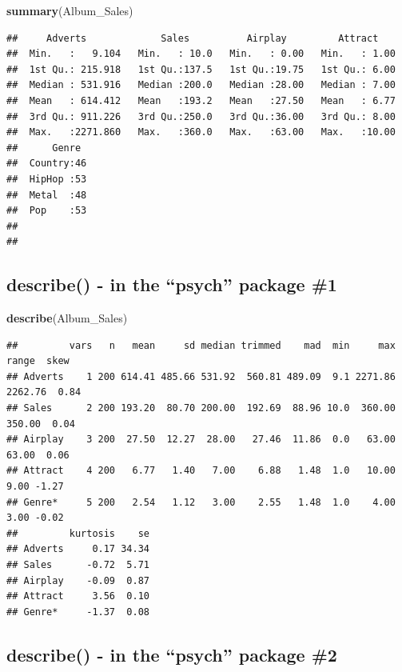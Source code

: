 \documentclass[
]{book}
\newenvironment{Shaded}{\begin{snugshade}}{\end{snugshade}}
\newcommand{\KeywordTok}[1]{\textcolor[rgb]{0.13,0.29,0.53}{\textbf{#1}}}
\newcommand{\NormalTok}[1]{#1}
\begin{document}
\begin{Shaded}
\begin{Highlighting}[]
\KeywordTok{summary}\NormalTok{(Album_Sales)}
\end{Highlighting}
\end{Shaded}

\begin{verbatim}
##     Adverts             Sales          Airplay         Attract     
##  Min.   :   9.104   Min.   : 10.0   Min.   : 0.00   Min.   : 1.00  
##  1st Qu.: 215.918   1st Qu.:137.5   1st Qu.:19.75   1st Qu.: 6.00  
##  Median : 531.916   Median :200.0   Median :28.00   Median : 7.00  
##  Mean   : 614.412   Mean   :193.2   Mean   :27.50   Mean   : 6.77  
##  3rd Qu.: 911.226   3rd Qu.:250.0   3rd Qu.:36.00   3rd Qu.: 8.00  
##  Max.   :2271.860   Max.   :360.0   Max.   :63.00   Max.   :10.00  
##      Genre   
##  Country:46  
##  HipHop :53  
##  Metal  :48  
##  Pop    :53  
##              
## 
\end{verbatim}

\hypertarget{describe---in-the-psych-package-1}{%
\subsection{describe() - in the ``psych'' package \#1}\label{describe---in-the-psych-package-1}}

\begin{Shaded}
\begin{Highlighting}[]
\KeywordTok{describe}\NormalTok{(Album_Sales)}
\end{Highlighting}
\end{Shaded}

\begin{verbatim}
##         vars   n   mean     sd median trimmed    mad  min     max   range  skew
## Adverts    1 200 614.41 485.66 531.92  560.81 489.09  9.1 2271.86 2262.76  0.84
## Sales      2 200 193.20  80.70 200.00  192.69  88.96 10.0  360.00  350.00  0.04
## Airplay    3 200  27.50  12.27  28.00   27.46  11.86  0.0   63.00   63.00  0.06
## Attract    4 200   6.77   1.40   7.00    6.88   1.48  1.0   10.00    9.00 -1.27
## Genre*     5 200   2.54   1.12   3.00    2.55   1.48  1.0    4.00    3.00 -0.02
##         kurtosis    se
## Adverts     0.17 34.34
## Sales      -0.72  5.71
## Airplay    -0.09  0.87
## Attract     3.56  0.10
## Genre*     -1.37  0.08
\end{verbatim}

\hypertarget{describe---in-the-psych-package-2}{%
\subsection{describe() - in the ``psych'' package \#2}\label{describe---in-the-psych-package-2}}
\end{document}
